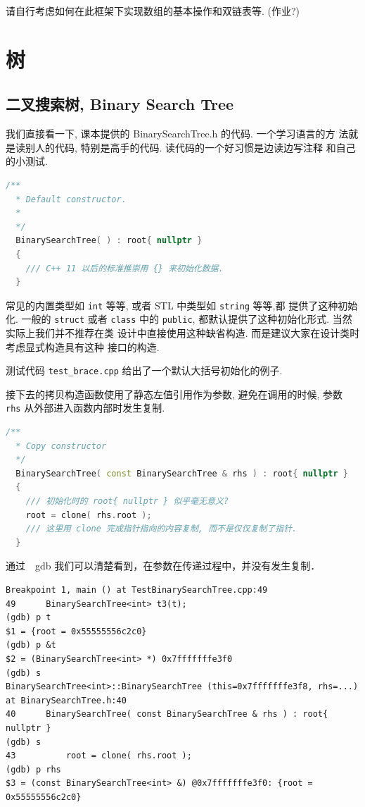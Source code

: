 \documentclass[a4paper]{ctexart}
\theoremstyle{definition}
\theoremstyle{definition}
\begin{document}
请自行考虑如何在此框架下实现数组的基本操作和双链表等. (作业?)

\section{树}

\subsection{二叉搜索树, Binary Search Tree}

我们直接看一下, 课本提供的 BinarySearchTree.h 的代码. 一个学习语言的方
法就是读别人的代码, 特别是高手的代码. 读代码的一个好习惯是边读边写注释
和自己的小测试.

\begin{lstlisting}[language=C++]
  /** 
  * Default constructor. 
  * 
  */
  BinarySearchTree( ) : root{ nullptr } 
  {
    /// C++ 11 以后的标准推崇用 {} 来初始化数据.  
  }
\end{lstlisting}

常见的内置类型如 \verb|int| 等等, 或者 STL 中类型如 \verb|string| 等等,都
提供了这种初始化. 一般的 \verb|struct| 或者 \verb|class| 中的
\verb|public|, 都默认提供了这种初始化形式. 当然实际上我们并不推荐在类
设计中直接使用这种缺省构造. 而是建议大家在设计类时考虑显式构造具有这种
接口的构造. 

测试代码 \verb|test_brace.cpp| 给出了一个默认大括号初始化的例子.

接下去的拷贝构造函数使用了静态左值引用作为参数, 避免在调用的时候, 参数
\verb|rhs| 从外部进入函数内部时发生复制.

\begin{lstlisting}[language=C++]
  /**
  * Copy constructor
  */
  BinarySearchTree( const BinarySearchTree & rhs ) : root{ nullptr }
  {
    /// 初始化时的 root{ nullptr } 似乎毫无意义?
    root = clone( rhs.root );
    /// 这里用 clone 完成指针指向的内容复制, 而不是仅仅复制了指针.
  }
\end{lstlisting}

通过　gdb 我们可以清楚看到，在参数在传递过程中，并没有发生复制．

\begin{verbatim}
Breakpoint 1, main () at TestBinarySearchTree.cpp:49
49	    BinarySearchTree<int> t3(t);
(gdb) p t
$1 = {root = 0x55555556c2c0}
(gdb) p &t
$2 = (BinarySearchTree<int> *) 0x7fffffffe3f0
(gdb) s
BinarySearchTree<int>::BinarySearchTree (this=0x7fffffffe3f8, rhs=...) 
at BinarySearchTree.h:40
40	    BinarySearchTree( const BinarySearchTree & rhs ) : root{ nullptr }
(gdb) s
43			root = clone( rhs.root );
(gdb) p rhs
$3 = (const BinarySearchTree<int> &) @0x7fffffffe3f0: {root = 0x55555556c2c0}
\end{verbatim}
\end{document}
